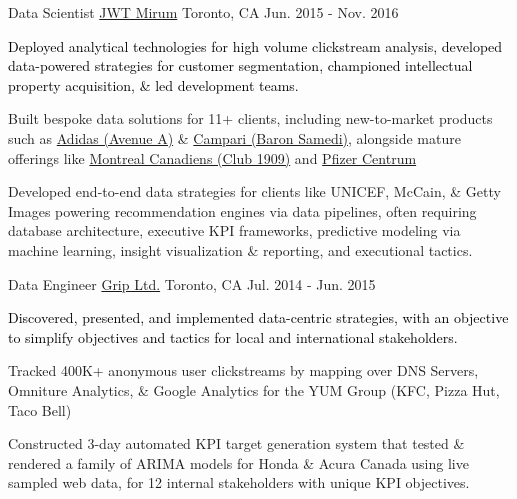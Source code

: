 \begin{cventries}
	\cventry
	{Data Scientist} %
	{\href{https://www.mirumagency.com/en/home}{JWT Mirum}} %
	{Toronto, CA} %
	{Jun. 2015 - Nov. 2016} %
	{
		\textcolor{black}{Deployed analytical technologies for high volume clickstream analysis, developed data-powered strategies for customer segmentation, championed intellectual property acquisition, \& led development teams.}
		\textcolor{text}{
			\begin{cvitems} %
				\item {Built bespoke data solutions for 11+ clients, including new-to-market products such as \href{https://www.adidasavenuea.com/}{Adidas (Avenue A)} \&  \href{http://www.baronsamedi.com/}{Campari (Baron Samedi)}, alongside mature offerings like \href{https://www.club1909.com/}{Montreal Canadiens (Club 1909)} and \href{https://www.centrum.ca/}{Pfizer Centrum}}
				\item {Developed end-to-end data strategies for clients like UNICEF, McCain, \& Getty Images powering recommendation engines via data pipelines, often requiring database architecture, executive KPI frameworks, predictive modeling via machine learning, insight visualization \& reporting, and executional tactics.}
			\end{cvitems}
			\newline
		}
	}

	\cventry
	{Data Engineer} %
	{\href{https://www.griplimited.com/}{Grip Ltd.}} %
	{Toronto, CA} %
	{Jul. 2014 - Jun. 2015} %
	{
		\textcolor{black}{Discovered, presented, and implemented data-centric strategies, with an objective to simplify objectives and tactics for local and international stakeholders.}
		\textcolor{text}{
			\begin{cvitems} %
				\item {Tracked 400K+ anonymous user clickstreams by mapping over DNS Servers, Omniture Analytics, \& Google Analytics for the YUM Group (KFC, Pizza Hut, Taco Bell)}
				\item {Constructed 3-day automated KPI target generation system that tested \& rendered a family of ARIMA models for Honda \& Acura Canada using live sampled web data, for 12 internal stakeholders with unique KPI objectives.}
			\end{cvitems}
		}
	}


\end{cventries}
